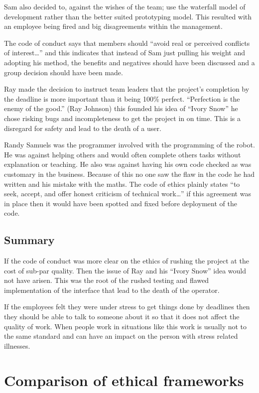 \documentclass[a4paper]{article}
\begin{document}
Sam also decided to, against the wishes of the team; use the waterfall model of development rather than the better suited prototyping model. This resulted with an employee being fired and big disagreements within the management.

The code of conduct says that members should ``avoid real or perceived conflicts of interest…'' and this indicates that instead of Sam just pulling his weight and adopting his method, the benefits and negatives should have been discussed and a group decision should have been made.

Ray made the decision to instruct team leaders that the project’s completion by the deadline is more important than it being 100\% perfect. ``Perfection is the enemy of the good.'' (Ray Johnson) this founded his idea of ``Ivory Snow'' he chose risking bugs and incompleteness to get the project in on time. This is a disregard for safety and lead to the death of a user.

Randy Samuels was the programmer involved with the programming of the robot. He was against helping others and would often complete others tasks without explanation or teaching. He also was against having his own code checked as was customary in the business.
Because of this no one saw the flaw in the code he had written and his mistake with the maths. The code of ethics plainly states ``to seek, accept, and offer honest criticism of technical work…'' if this agreement was in place then it would have been spotted and fixed before deployment of the code. 
\subsection{Summary}

If the code of conduct was more clear on the ethics of rushing the project at the cost of sub-par quality. Then the issue of Ray and his “Ivory Snow” idea would not have arisen. This was the root of the rushed testing and flawed implementation of the interface that lead to the death of the operator.

If the employees felt they were under stress to get things done by deadlines then they should be able to talk to someone about it so that it does not affect the quality of work. 
When people work in situations like this work is usually not to the same standard and can have an impact on the person with stress related illnesses.


\section{Comparison of ethical frameworks}
\end{document}
